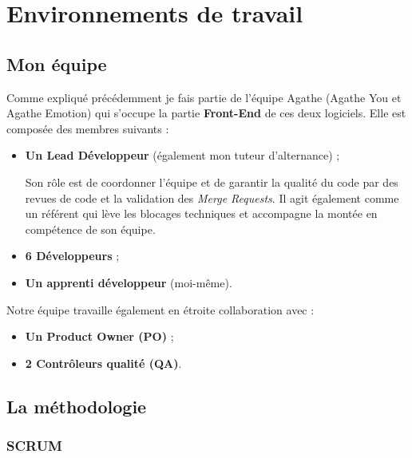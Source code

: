 \documentclass{article}
\begin{document}
\newpage

\section{Environnements de travail}

\subsection{Mon équipe}

Comme expliqué précédemment je fais partie de l'équipe Agathe (Agathe You et Agathe Emotion)
qui s'occupe la partie \textbf{Front-End} de ces deux logiciels. Elle est composée des membres suivants :

\begin{itemize}
    \item \textbf{Un Lead Développeur} (également mon tuteur d'alternance) ;

         Son rôle est de coordonner l'équipe et de garantir la qualité du code par des revues de code et la validation des \textit{Merge Requests}. Il agit également comme un référent qui lève les blocages techniques et accompagne la montée en compétence de son équipe.
         
    \item \textbf{6 Développeurs} ;
    \item \textbf{Un apprenti développeur} (moi-même).
\end{itemize}

Notre équipe travaille également en étroite collaboration avec :

\begin{itemize}
    \item \textbf{Un Product Owner (PO)} ;
    \item \textbf{2 Contrôleurs qualité (QA)}.
\end{itemize}

\subsection{La méthodologie}

\subsubsection{SCRUM}
\end{document}
